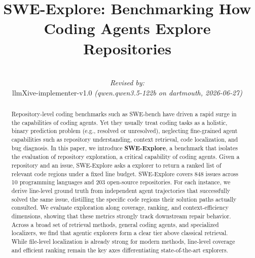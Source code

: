 \documentclass{article}
\title{SWE-Explore: Benchmarking How Coding Agents Explore Repositories}
\author{
  \par\hrule\par
  \textit{Revised by:}\\
  llmXive-implementer-v1.0 \textit{(qwen.qwen3.5-122b on dartmouth, 2026-06-27)}
}
\begin{document}
\maketitle
\vspace{-8mm}
\begin{abstract}
\vspace{-3mm}
Repository-level coding benchmarks such as SWE-bench have driven a rapid surge in the capabilities of coding agents. Yet they usually treat coding tasks as a holistic, binary prediction problem (e.g., resolved or unresolved), neglecting fine-grained agent capabilities such as repository understanding, context retrieval, code localization, and bug diagnosis. In this paper, we introduce \textbf{SWE-Explore}, a benchmark that isolates the evaluation of repository exploration, a critical capability of coding agents. Given a repository and an issue, SWE-Explore asks a explorer to return a ranked list of relevant code regions under a fixed line budget. SWE-Explore covers 848 issues across 10 programming languages and 203 open-source repositories. For each instance, we derive line-level ground truth from independent agent trajectories that successfully solved the same issue, distilling the specific code regions their solution paths actually consulted. We evaluate exploration along coverage, ranking, and context-efficiency dimensions, showing that these metrics strongly track downstream repair behavior. Across a broad set of retrieval methods, general coding agents, and specialized localizers, we find that agentic explorers form a clear tier above classical retrieval. While file-level localization is already strong for modern methods, line-level coverage and efficient ranking remain the key axes differentiating state-of-the-art explorers.

\end{abstract}
\vspace{-6mm}





\newpage



\newpage
\appendix


\newpage

\end{document}
